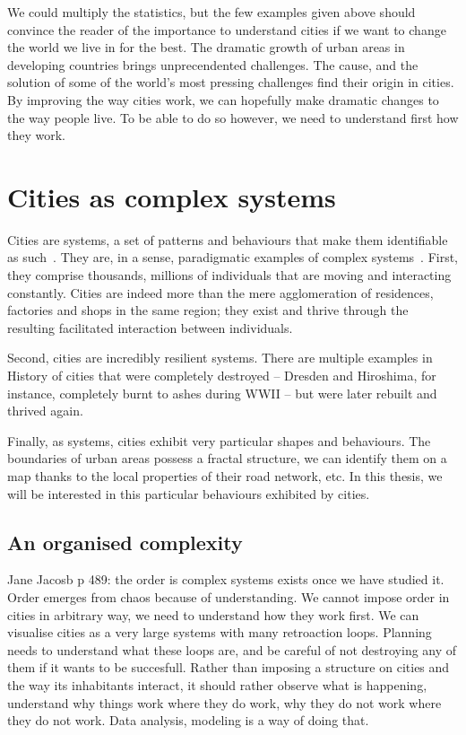 We could multiply the statistics, but the few examples given above should
convince the reader of the importance to understand cities if we want to
change the world we live in for the best. The dramatic growth of urban areas in
developing countries brings unprecendented challenges. The cause, and the
solution of some of the world's most pressing challenges find their origin in
cities. By improving the way cities work, we can hopefully make dramatic changes
to the way people live. To be able to do so however, we need to understand first
how they work.\\


\section{Cities as complex systems}
\label{sec:cities_as_complex_systems}

Cities are systems, a set of patterns and behaviours that make them identifiable
as such~\cite{Dennett:1991}. They are, in a sense, paradigmatic examples of
complex systems~\cite{Ladyman:2013}. 
First, they comprise thousands, millions of individuals that are moving and
interacting constantly. Cities are indeed more than the mere agglomeration of
residences, factories and shops in the same region; they exist and thrive
through the resulting facilitated interaction between individuals. 

Second, cities are incredibly resilient systems. There are multiple examples in
History of cities that were completely destroyed -- Dresden and Hiroshima, for
instance, completely burnt to ashes during WWII -- but were later rebuilt and
thrived again.

Finally, as systems, cities exhibit very particular shapes and behaviours. The
boundaries of urban areas possess a fractal structure, we can identify them on a
map thanks to the local properties of their road network, etc. In this thesis,
we will be interested in this particular behaviours exhibited by cities.\\


\subsection{An organised complexity}
\label{sub:an_organised_complexity}

Jane Jacosb p 489: the order is complex systems exists once we have studied it.
Order emerges from chaos because of understanding. We cannot impose order in
cities in arbitrary way, we need to understand how they work first. We can
visualise cities as a very large systems with many retroaction loops. Planning
needs to understand what these loops are, and be careful of not destroying any
of them if it wants to be succesfull. Rather than imposing a structure on cities
and the way its inhabitants interact, it should rather observe what is
happening, understand why things work where they do work, why they do not work
where they do not work. Data analysis, modeling is a way of doing that.

